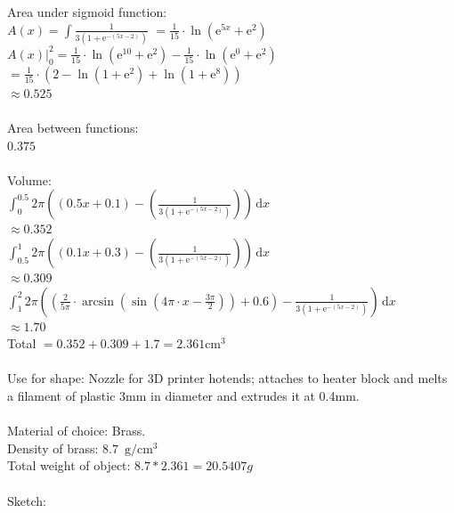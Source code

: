 \documentclass[12pt]{article}
\newcommand{\me}{\mathrm{e}}
\newcommand{\dx}{\mathrm{d}x}
\begin{document}
    Area under sigmoid function:\\
    $A(x) = \int\!\frac{1}{3(1 + \me^{-(5x-2)})}$
    $= \frac{1}{15}\cdot \ln{(\me^{5x} + \me^2)}$\\
    $A(x)|_{0}^{2} = \frac{1}{15}\cdot \ln{(\me^{10} + \me^2)} - \frac{1}{15}\cdot \ln{(\me^{0} + \me^2)}$\\
    $= \frac{1}{15} \cdot (2 - \ln{(1 + \me^2)} + \ln{(1 + \me^8)})$\\
    $\approx 0.525$\\\\

    Area between functions:\\
    $0.375$\\\\

    Volume:\\
    $\int_{0}^{0.5}\! 2\pi((0.5x + 0.1) - (\frac{1}{3(1 + \me^{-(5x-2)})}))\,\dx$\\
    $\approx 0.352$\\
    $\int_{0.5}^{1}\! 2\pi((0.1x + 0.3) - (\frac{1}{3(1 + \me^{-(5x-2)})}))\,\dx$\\
    $\approx 0.309$\\
    $\int_{1}^{2}\!   2\pi((\frac{2}{5\pi}\cdot\arcsin{(\sin{(4\pi\cdot x - \frac{3\pi}{2})})} + 0.6) - \frac{1}{3(1 + \me^{-(5x-2)})}) \,\dx$\\
    $\approx 1.70$\\
    Total $= 0.352 + 0.309 + 1.7 = 2.361 $cm$^3$\\\\


    Use for shape: Nozzle for 3D printer hotends; attaches to heater block and melts a filament of plastic 3mm in diameter and extrudes it at 0.4mm.\\\\

    Material of choice: Brass.\\
    Density of brass: $8.7\,\,\, \mathrm{g}/\mathrm{cm}^3$\\
    Total weight of object: $8.7 * 2.361 = 20.5407 g$\\\\
    
    Sketch:


\thispagestyle{fancy}
\end{document}

